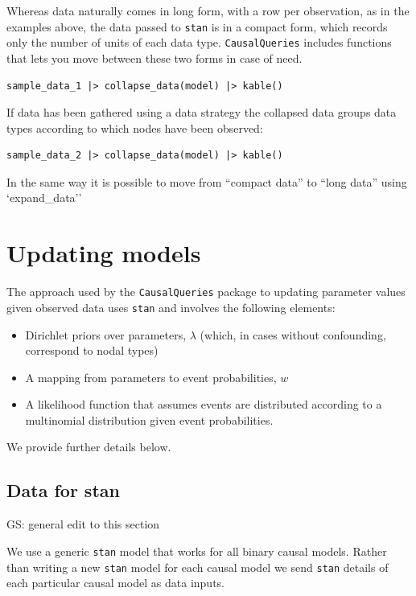 \documentclass[
  article]{jss}
\providecommand{\tightlist}{%
  \setlength{\itemsep}{0pt}\setlength{\parskip}{0pt}}\usepackage{longtable,booktabs,array}
\begin{document}
Whereas data naturally comes in long form, with a row per observation,
as in the examples above, the data passed to \texttt{stan} is in a
compact form, which records only the number of units of each data type.
\texttt{CausalQueries} includes functions that lets you move between
these two forms in case of need.

\begin{verbatim}
sample_data_1 |> collapse_data(model) |> kable()
\end{verbatim}

If data has been gathered using a data strategy the collapsed data
groups data types according to which nodes have been observed:

\begin{verbatim}
sample_data_2 |> collapse_data(model) |> kable()
\end{verbatim}

In the same way it is possible to move from ``compact data'' to ``long
data'' using `expand\_data''

\hypertarget{updating-models}{%
\section{Updating models}\label{updating-models}}

The approach used by the \texttt{CausalQueries} package to updating
parameter values given observed data uses \texttt{stan} and involves the
following elements:

\begin{itemize}
\tightlist
\item
  Dirichlet priors over parameters, \(\lambda\) (which, in cases without
  confounding, correspond to nodal types)
\item
  A mapping from parameters to event probabilities, \(w\)
\item
  A likelihood function that assumes events are distributed according to
  a multinomial distribution given event probabilities.
\end{itemize}

We provide further details below.

\hypertarget{data-for-stan}{%
\subsection{Data for stan}\label{data-for-stan}}

GS: general edit to this section

We use a generic \texttt{stan} model that works for all binary causal
models. Rather than writing a new \texttt{stan} model for each causal
model we send \texttt{stan} details of each particular causal model as
data inputs.
\end{document}
